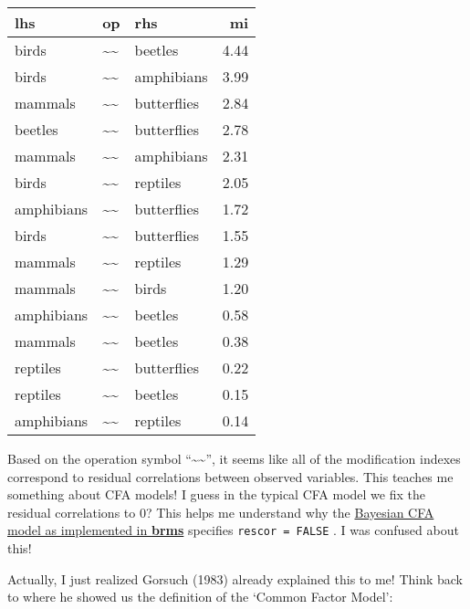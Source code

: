 \documentclass[
  letterpaper,
  DIV=11,
  numbers=noendperiod]{scrreprt}
\begin{document}
\begin{longtable}[]{@{}lllr@{}}
\toprule()
lhs & op & rhs & mi \\
\midrule()
\endhead
birds & \textasciitilde\textasciitilde{} & beetles & 4.44 \\
birds & \textasciitilde\textasciitilde{} & amphibians & 3.99 \\
mammals & \textasciitilde\textasciitilde{} & butterflies & 2.84 \\
beetles & \textasciitilde\textasciitilde{} & butterflies & 2.78 \\
mammals & \textasciitilde\textasciitilde{} & amphibians & 2.31 \\
birds & \textasciitilde\textasciitilde{} & reptiles & 2.05 \\
amphibians & \textasciitilde\textasciitilde{} & butterflies & 1.72 \\
birds & \textasciitilde\textasciitilde{} & butterflies & 1.55 \\
mammals & \textasciitilde\textasciitilde{} & reptiles & 1.29 \\
mammals & \textasciitilde\textasciitilde{} & birds & 1.20 \\
amphibians & \textasciitilde\textasciitilde{} & beetles & 0.58 \\
mammals & \textasciitilde\textasciitilde{} & beetles & 0.38 \\
reptiles & \textasciitilde\textasciitilde{} & butterflies & 0.22 \\
reptiles & \textasciitilde\textasciitilde{} & beetles & 0.15 \\
amphibians & \textasciitilde\textasciitilde{} & reptiles & 0.14 \\
\bottomrule()
\end{longtable}

Based on the operation symbol ``\textasciitilde\textasciitilde{}'', it
seems like all of the modification indexes correspond to residual
correlations between observed variables. This teaches me something about
CFA models! I guess in the typical CFA model we fix the residual
correlations to 0? This helps me understand why the
\href{https://discourse.mc-stan.org/t/confirmatory-factor-analysis-using-brms/23139}{Bayesian
CFA model as implemented in \textbf{brms}} specifies
\texttt{rescor\ =\ FALSE} . I was confused about this!

Actually, I just realized Gorsuch (1983) already explained this to me!
Think back to where he showed us the definition of the `Common Factor
Model':
\end{document}
